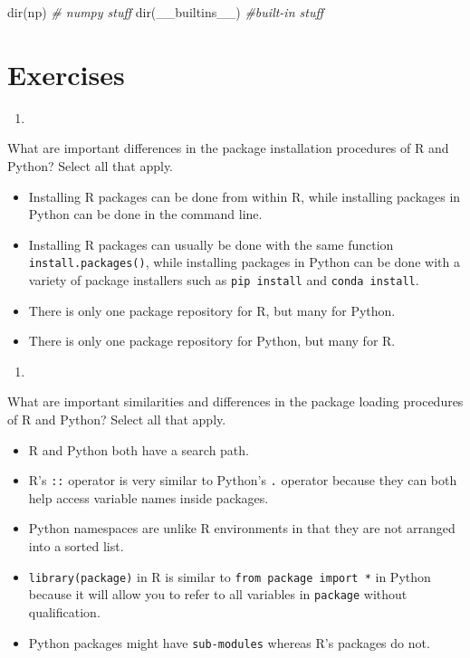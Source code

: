 \documentclass[12pt,krantz2]{krantz}
\makeatletter
\newenvironment{Shaded}{\begin{snugshade}}{\end{snugshade}}
\newcommand{\BuiltInTok}[1]{#1}
\newcommand{\CommentTok}[1]{\textcolor[rgb]{0.37,0.37,0.37}{\textit{#1}}}
\newcommand{\NormalTok}[1]{#1}
\providecommand{\tightlist}{%
  \setlength{\itemsep}{0pt}\setlength{\parskip}{0pt}}
\newenvironment{kframe}{%
\medskip{}
\setlength{\fboxsep}{.8em}
 \def\at@end@of@kframe{}%
 \ifinner\ifhmode%
  \def\at@end@of@kframe{\end{minipage}}%
  \begin{minipage}{\columnwidth}%
 \fi\fi%
 \def\FrameCommand##1{\hskip\@totalleftmargin \hskip-\fboxsep
 \colorbox{shadecolor}{##1}\hskip-\fboxsep
     \hskip-\linewidth \hskip-\@totalleftmargin \hskip\columnwidth}%
 \MakeFramed {\advance\hsize-\width
   \@totalleftmargin\z@ \linewidth\hsize
   \@setminipage}}%
 {\par\unskip\endMakeFramed%
 \at@end@of@kframe}
\renewenvironment{Shaded}{\begin{kframe}}{\end{kframe}}
\makeatother
\begin{document}
\begin{Shaded}
\begin{Highlighting}[]
\BuiltInTok{dir}\NormalTok{(np) }\CommentTok{# numpy stuff}
\BuiltInTok{dir}\NormalTok{(__builtins__) }\CommentTok{#built-in stuff}
\end{Highlighting}
\end{Shaded}

\hypertarget{exercises-8}{%
\section{Exercises}\label{exercises-8}}

\begin{enumerate}
\def\labelenumi{\arabic{enumi}.}
\item
\end{enumerate}

What are important differences in the package installation procedures of R and Python? Select all that apply.

\begin{itemize}
\tightlist
\item
  Installing R packages can be done from within R, while installing packages in Python can be done in the command line.
\item
  Installing R packages can usually be done with the same function \texttt{install.packages()}, while installing packages in Python can be done with a variety of package installers such as \texttt{pip\ install} and \texttt{conda\ install}.
\item
  There is only one package repository for R, but many for Python.
\item
  There is only one package repository for Python, but many for R.
\end{itemize}

\begin{enumerate}
\def\labelenumi{\arabic{enumi}.}
\setcounter{enumi}{1}
\item
\end{enumerate}

What are important similarities and differences in the package loading procedures of R and Python? Select all that apply.

\begin{itemize}
\tightlist
\item
  R and Python both have a search path.
\item
  R's \texttt{::} operator is very similar to Python's \texttt{.} operator because they can both help access variable names inside packages.
\item
  Python namespaces are unlike R environments in that they are not arranged into a sorted list.
\item
  \texttt{library(package)} in R is similar to \texttt{from\ package\ import\ *} in Python because it will allow you to refer to all variables in \texttt{package} without qualification.
\item
  Python packages might have \texttt{sub-modules} whereas R's packages do not.
\end{itemize}
\end{document}

